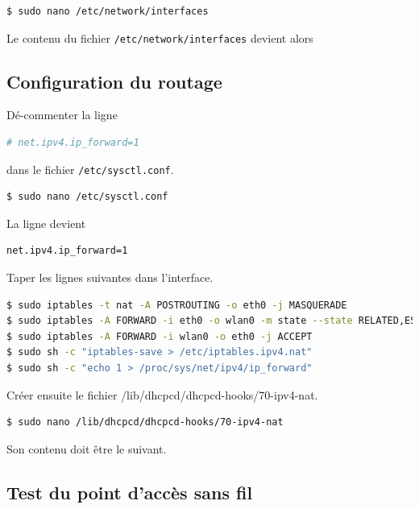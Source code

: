 \documentclass[11pt]{article}
\begin{document}
\begin{lstlisting}[language=bash]
$ sudo nano /etc/network/interfaces
\end{lstlisting}

Le contenu du fichier \lstinline{/etc/network/interfaces} devient alors



\subsection{Configuration du routage}

Dé-commenter la ligne 
\begin{lstlisting}[language=bash]
# net.ipv4.ip_forward=1
\end{lstlisting}
dans le fichier \lstinline{/etc/sysctl.conf}.

\begin{lstlisting}[language=bash]
$ sudo nano /etc/sysctl.conf
\end{lstlisting}

La ligne devient
\begin{lstlisting}[language=bash]
net.ipv4.ip_forward=1
\end{lstlisting}

Taper les lignes suivantes dans l'interface.

\begin{lstlisting}[language=bash]
$ sudo iptables -t nat -A POSTROUTING -o eth0 -j MASQUERADE
$ sudo iptables -A FORWARD -i eth0 -o wlan0 -m state --state RELATED,ESTABLISHED -j ACCEPT
$ sudo iptables -A FORWARD -i wlan0 -o eth0 -j ACCEPT
$ sudo sh -c "iptables-save > /etc/iptables.ipv4.nat"
$ sudo sh -c "echo 1 > /proc/sys/net/ipv4/ip_forward"
\end{lstlisting}

Créer ensuite le fichier {/lib/dhcpcd/dhcpcd-hooks/70-ipv4-nat}.
\begin{lstlisting}[language=bash]
$ sudo nano /lib/dhcpcd/dhcpcd-hooks/70-ipv4-nat
\end{lstlisting}

Son contenu doit être le suivant.



\subsection{Test du point d'accès sans fil}
\end{document}
